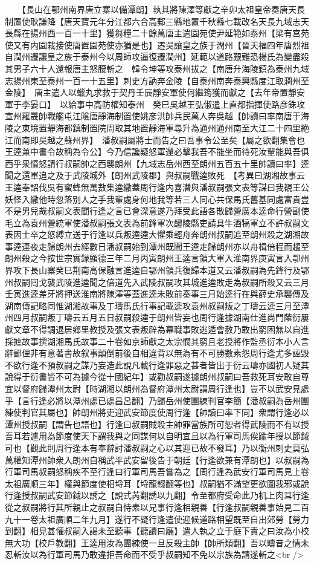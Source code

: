 　　【長山在鄂州南界唐立寨以備潭朗】執其將陳澤等獻之辛卯太祖皇帝奏唐天長制置使耿謙降【唐天寶元年分江都六合高郵三縣地置千秋縣七載改名天長九域志天長縣在揚州西一百一十里】獲芻糧二十餘萬唐主遣園苑使尹延範如泰州【梁有宫苑使又有内園栽接使唐置園苑使亦猶是也】遷吳讓皇之族于潤州【晉天福四年唐烈祖自潤州遷讓皇之族于泰州今以周師攻逼復遷潤州】延範以道路艱難恐楊氏為變盡殺其男子六十人還報唐主怒腰斬之　韓令坤等攻泰州拔之【南唐升海陵鎮為泰州九域志揚州東至泰州一百一十五里】刺史方訥奔金陵【自泰州南奔泰興縣度江取潤州至金陵】　唐主遣人以蠟丸求救于契丹壬辰靜安軍使何繼筠獲而獻之【去年帝置靜安軍于李晏口】　以給事中高防權知泰州　癸巳吳越王弘俶遣上直都指揮使路彦銖攻宣州羅晟帥戰艦屯江隂唐靜海制置使姚彦洪帥兵民萬人奔吳越【帥讀曰率南唐于海陵之東境置靜海都鎮制置院周取其地置靜海軍尋升為通州通州南至大江二十四里絶江而南即吳越之蘇州界】　潘叔嗣屬將士而告之曰吾事令公至矣【屬之欲翻集會也王逵兼中書令故稱為令公】今乃信讒疑怒軍還必擊我吾不能坐而待死汝輩能與吾俱西乎衆憤怒請行叔嗣帥之西襲朗州【九域志岳州西至朗州五百五十里帥讀曰率】逵聞之還軍追之及于武陵城外【朗州武陵郡】與叔嗣戰逵敗死　【考異曰湖湘故事云王逵奉詔伐吳有蜜蜂無萬數集逵繖蓋周行逢内喜潛與潘叔嗣張文表等謀曰我覩王公妖怪入繖他時忽落别人之手我輩處身何地我等若三人同心共保馬氏舊基同處富貴豈不是男兒哉叔嗣文表聞行逢之言已會深意遂乃拜受此語各散歸營廣本逵命行營副使毛立為袁州營統軍使潘叔嗣張文表為前鋒軍次醴陵縣吏請具牛酒犒軍立不許叔嗣文表因士卒之怒縛立送于行逢以兵叛逵逵大懼乘輕舟奔朗州叔嗣追至朗州殺之湖湘故事逵連夜走歸朗州去經數日潘叔嗣始到潭州既聞王逵走歸朗州亦以舟楫倍程而趨至朗州殺之今按世宗實録顯德三年二月丙寅朗州王逵言領大軍入淮南界庚寅言入鄂州界攻下長山寨癸巳荆南高保融言進逵自鄂州領兵復歸本道又云潘叔嗣為先鋒行及鄂州叔嗣囘戈襲武陵進逵聞之倍道先入武陵叔嗣攻其城進逵敗走為叔嗣所殺又云三月壬寅進逵差牙將押送淮南將陳澤等蓋進逵未敗前奏事三月始逵行在與薛史承襲傳及湖南傳記略同惟湖湘故事及丁璹馬氏行事記載逵攻袁州叔嗣叛之丁璹云逵三月至潭州四月叔嗣叛丁璹云五月五日叔嗣殺逵于朗州皆妄也周行逢據湖南仕進尚門䕃衍屢獻文章不得調退居鄉里教授及張文表叛辟為幕職事敗逃遁會赦乃敢出窮困無以自進採摭故事撰湖湘馬氏故事二十卷如京師獻之太宗憫其窮且老授將作監丞衍本小人言辭鄙俚非有意著書故叙事顛倒前後自相違背以無為有不可勝數素怨周行逢尤多誣毁不欲行逢不預叔嗣之謀乃妄造此說凡載行逢罪惡之甚者皆出于衍云璹亦國初人疑其說得于衍書皆不可為據今從十國紀年】或勸叔嗣遂據朗州叔嗣曰吾救死耳安敢自尊宜以督府歸潭州太尉【時湖湘以朗州為督府潭州太尉謂周行逢也】豈不以武安見處乎【言行逢必將以潭州處已處昌呂翻】乃歸岳州使團練判官李簡【潘叔嗣為岳州團練使判官其屬也】帥朗州將吏迎武安節度使周行逢【帥讀曰率下同】衆謂行逢必以潭州授叔嗣【謂告也語也】行逢曰叔嗣賊殺主帥罪當族所可恕者得武陵而不有以授吾耳若遽用為節度使天下謂我與之同謀何以自明宜且以為行軍司馬俟踰年授以節鉞可也【觀此則周行逢本有奉辭討潘叔嗣之心以其迎已故不發耳】乃以衡州刺史莫弘萬權知潭州帥衆入朗州自稱武平武安留後告于朝廷【行逢欲兼有潭朗也】以叔嗣為行軍司馬叔嗣怒稱疾不至行逢曰行軍司馬吾嘗為之【周行逢為武安行軍司馬見上卷太祖廣順三年】權與節度使相埒耳【埒龍輟翻等也】叔嗣猶不滿望更欲圖我邪或說行逢授叔嗣武安節鉞以誘之【說式芮翻誘以九翻】令至都府受命此乃机上肉耳行逢從之叔嗣將行其所親止之叔嗣自恃素以兄事行逢相親善【行逢叔嗣親善事始見二百九十一卷太祖廣順二年九月】遂行不疑行逢遣使迎候道路相望既至自出郊勞【勞力到翻】相見甚懽叔嗣入謁未至聽事【聽讀曰廳】遣人執之立于庭下責之曰汝為小校無大功【校戶教翻】王逵用汝為團練使一旦反殺主帥【帥所類翻】吾以疇昔之情未忍斬汝以為行軍司馬乃敢違拒吾命而不受乎叔嗣知不免以宗族為請遂斬之<br />
